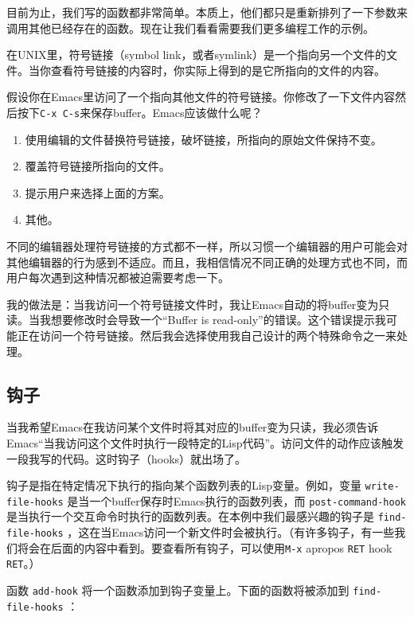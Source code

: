 目前为止，我们写的函数都非常简单。本质上，他们都只是重新排列了一下参数来调用其他已经存在的函数。现在让我们看看需要我们更多编程工作的示例。

在UNIX里，符号链接（symbol link，或者symlink）是一个指向另一个文件的文件。当你查看符号链接的内容时，你实际上得到的是它所指向的文件的内容。

假设你在Emacs里访问了一个指向其他文件的符号链接。你修改了一下文件内容然后按下\verb|C-x C-s|来保存buffer。Emacs应该做什么呢？

\begin{enumerate}
  \item 使用编辑的文件替换符号链接，破坏链接，所指向的原始文件保持不变。
  \item 覆盖符号链接所指向的文件。
  \item 提示用户来选择上面的方案。
  \item 其他。
\end{enumerate}

不同的编辑器处理符号链接的方式都不一样，所以习惯一个编辑器的用户可能会对其他编辑器的行为感到不适应。而且，我相信情况不同正确的处理方式也不同，而用户每次遇到这种情况都被迫需要考虑一下。

我的做法是：当我访问一个符号链接文件时，我让Emacs自动的将buffer变为只读。当我想要修改时会导致一个“Buffer is read-only”的错误。这个错误提示我可能正在访问一个符号链接。然后我会选择使用我自己设计的两个特殊命令之一来处理。

\subsection{钩子}
\label{section:02-Hooks}

当我希望Emacs在我访问某个文件时将其对应的buffer变为只读，我必须告诉Emacs“当我访问这个文件时执行一段特定的Lisp代码”。访问文件的动作应该触发一段我写的代码。这时钩子（hooks）就出场了。

钩子是指在特定情况下执行的指向某个函数列表的Lisp变量。例如，变量 \texttt{write-file-hooks} 是当一个buffer保存时Emacs执行的函数列表，而 \texttt{post-command-hook} 是当执行一个交互命令时执行的函数列表。在本例中我们最感兴趣的钩子是 \texttt{find-file-hooks} ，这在当Emacs访问一个新文件时会被执行。（有许多钩子，有一些我们将会在后面的内容中看到。要查看所有钩子，可以使用\verb|M-x| apropos \verb|RET| hook \verb|RET|。）

函数 \texttt{add-hook} 将一个函数添加到钩子变量上。下面的函数将被添加到 \texttt{find-file-hooks} ：

